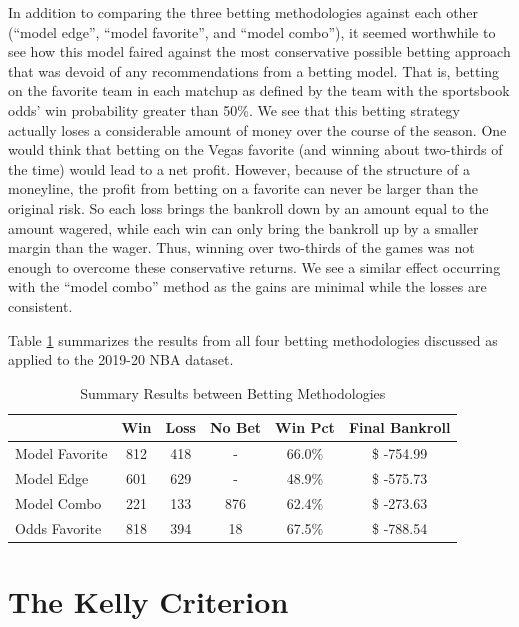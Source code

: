 \documentclass [MS] {uclathes}
\begin{document}
In addition to comparing the three betting methodologies against each other (``model edge'', ``model favorite'', and ``model combo''), it seemed worthwhile to see how this model faired against the most conservative possible betting approach that was devoid of any recommendations from a betting model. That is, betting on the favorite team in each matchup as defined by the team with the sportsbook odds' win probability greater than 50\%. We see that this betting strategy actually loses a considerable amount of money over the course of the season. One would think that betting on the Vegas favorite (and winning about two-thirds of the time) would lead to a net profit. However, because of the structure of a moneyline, the profit from betting on a favorite can never be larger than the original risk. So each loss brings the bankroll down by an amount equal to the amount wagered, while each win can only bring the bankroll up by a smaller margin than the wager. Thus, winning over two-thirds of the games was not enough to overcome these conservative returns. We see a similar effect occurring with the ``model combo'' method as the gains are minimal while the losses are consistent.

Table \ref{tab:bet-results} summarizes the results from all four betting methodologies discussed as applied to the 2019-20 NBA dataset.

\begin{table}[]
\centering
\caption{Summary Results between Betting Methodologies}
\label{tab:bet-results}
\begin{tabular}{@{}lccccc@{}}
\toprule
 & Win & Loss & No Bet & Win Pct & Final Bankroll \\ \midrule
Model Favorite & 812 & 418 & - & 66.0\% & \$ -754.99 \\
Model Edge & 601 & 629 & - & 48.9\% & \$ -575.73 \\
Model Combo & 221 & 133 & 876 & 62.4\%  & \$ -273.63 \\ 
Odds Favorite & 818 & 394 & 18 & 67.5\% & \$ -788.54 \\ \bottomrule
\end{tabular}
\end{table}

\chapter{The Kelly Criterion}
\end{document}
